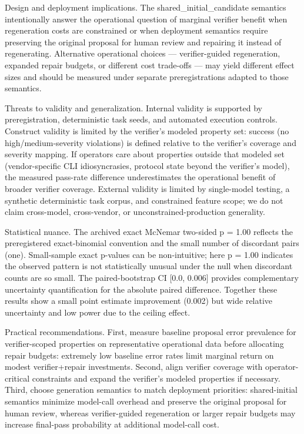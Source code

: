 \documentclass[conference]{IEEEtran}
\begin{document}
Design and deployment implications. The shared\_initial\_candidate semantics intentionally answer the operational question of marginal verifier benefit when regeneration costs are constrained or when deployment semantics require preserving the original proposal for human review and repairing it instead of regenerating. Alternative operational choices --- verifier-guided regeneration, expanded repair budgets, or different cost trade-offs --- may yield different effect sizes and should be measured under separate preregistrations adapted to those semantics.

Threats to validity and generalization. Internal validity is supported by preregistration, deterministic task seeds, and automated execution controls. Construct validity is limited by the verifier's modeled property set: success (no high/medium-severity violations) is defined relative to the verifier's coverage and severity mapping. If operators care about properties outside that modeled set (vendor-specific CLI idiosyncrasies, protocol state beyond the verifier's model), the measured pass-rate difference underestimates the operational benefit of broader verifier coverage. External validity is limited by single-model testing, a synthetic deterministic task corpus, and constrained feature scope; we do not claim cross-model, cross-vendor, or unconstrained-production generality.

Statistical nuance. The archived exact McNemar two-sided p = 1.00 reflects the preregistered exact-binomial convention and the small number of discordant pairs (one). Small-sample exact p-values can be non-intuitive; here p = 1.00 indicates the observed pattern is not statistically unusual under the null when discordant counts are so small. The paired-bootstrap CI [0.0, 0.006] provides complementary uncertainty quantification for the absolute paired difference. Together these results show a small point estimate improvement (0.002) but wide relative uncertainty and low power due to the ceiling effect.

Practical recommendations. First, measure baseline proposal error prevalence for verifier-scoped properties on representative operational data before allocating repair budgets: extremely low baseline error rates limit marginal return on modest verifier+repair investments. Second, align verifier coverage with operator-critical constraints and expand the verifier's modeled properties if necessary. Third, choose generation semantics to match deployment priorities: shared-initial semantics minimize model-call overhead and preserve the original proposal for human review, whereas verifier-guided regeneration or larger repair budgets may increase final-pass probability at additional model-call cost.
\end{document}
